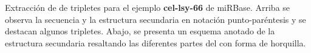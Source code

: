 \label{triplet}
Extracción de  de tripletes para el
ejemplo \textbf{cel-lsy-66} de miRBase. Arriba se observa la secuencia
y la estructura secundaria en notación punto-paréntesis y se destacan
algunos tripletes.  Abajo, se presenta un esquema anotado de la
estructura secundaria resaltando las diferentes partes del \premirna{}
con forma de horquilla.

